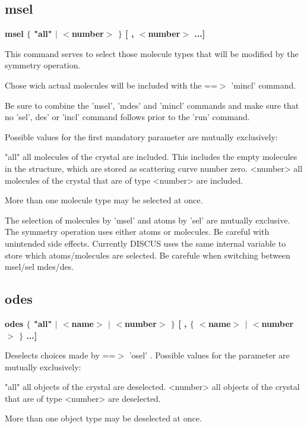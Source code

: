 \subsection*{msel}
{\bf msel $ \{$ "all" $| $ $ <$number$> $ $\} $ [ , $ <$number$> $ ...] \par }
\par
\vspace{3pt}
This command serves to select those molecule types 
that will be modified by the symmetry operation. 
\par
Chose wich actual molecules will be included with the 
==$> $ 'mincl' command. 
\par
Be sure to combine the 'msel', 'mdes' and 'mincl' commands and 
make sure that no 'sel', des' or 'incl' command follows 
prior to the 'run' command. 
\par
Possible values for the first mandatory parameter are mutually 
exclusively: 
\par
\begin{MacVerbatim}
"all"     all molecules of the crystal are included.
          This includes the empty molecules in the structure, which are
          stored as scattering curve number zero.
<number>  all molecules of the crystal that are of type <number>
          are included.
\end{MacVerbatim}
More than one molecule type may be selected at once. 
\par
The selection of molecules by 'msel' and atoms by 'sel' are mutually 
exclusive. The symmetry operation uses either atoms or molecules. 
Be careful with unintended side effects. Currently DISCUS uses the 
same internal variable to store which atoms/molecules are selected. 
Be carefule when switching between msel/sel mdes/des. 
\subsection*{odes}
{\bf odes $ \{$ "all" $| $ $ <$name$> $ $| $ $ <$number$> $ $\} $ [ , $ \{$ $ <$name$> $ $| $ $ <$number$> $ $\} $ ...] \par }
\par
\vspace{3pt}
Deselects choices made by ==$> $ 'osel' . Possible values 
for the parameter are mutually exclusively: 
\par
\begin{MacVerbatim}
"all"     all objects of the crystal are deselected.
<number>  all objects of the crystal that are of type <number>
          are deselected.
\end{MacVerbatim}
More than one object type may be deselected at once. 
